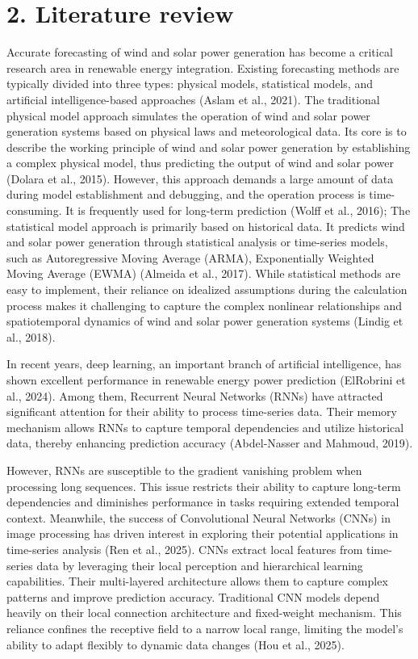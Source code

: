 \documentclass[
  10
]{article}
\begin{document}
\section{2. Literature review}\label{literature-review}

Accurate forecasting of wind and solar power generation has become a
critical research area in renewable energy integration. Existing
forecasting methods are typically divided into three types: physical
models, statistical models, and artificial intelligence-based approaches
(Aslam et al., 2021). The traditional physical model approach simulates
the operation of wind and solar power generation systems based on
physical laws and meteorological data. Its core is to describe the
working principle of wind and solar power generation by establishing a
complex physical model, thus predicting the output of wind and solar
power (Dolara et al., 2015). However, this approach demands a large
amount of data during model establishment and debugging, and the
operation process is time-consuming. It is frequently used for long-term
prediction (Wolff et al., 2016); The statistical model approach is
primarily based on historical data. It predicts wind and solar power
generation through statistical analysis or time-series models, such as
Autoregressive Moving Average (ARMA), Exponentially Weighted Moving
Average (EWMA) (Almeida et al., 2017). While statistical methods are
easy to implement, their reliance on idealized assumptions during the
calculation process makes it challenging to capture the complex
nonlinear relationships and spatiotemporal dynamics of wind and solar
power generation systems (Lindig et al., 2018).

In recent years, deep learning, an important branch of artificial
intelligence, has shown excellent performance in renewable energy power
prediction (ElRobrini et al., 2024). Among them, Recurrent Neural
Networks (RNNs) have attracted significant attention for their ability
to process time-series data. Their memory mechanism allows RNNs to
capture temporal dependencies and utilize historical data, thereby
enhancing prediction accuracy (Abdel-Nasser and Mahmoud, 2019).

However, RNNs are susceptible to the gradient vanishing problem when
processing long sequences. This issue restricts their ability to capture
long-term dependencies and diminishes performance in tasks requiring
extended temporal context. Meanwhile, the success of Convolutional
Neural Networks (CNNs) in image processing has driven interest in
exploring their potential applications in time-series analysis (Ren et
al., 2025). CNNs extract local features from time-series data by
leveraging their local perception and hierarchical learning
capabilities. Their multi-layered architecture allows them to capture
complex patterns and improve prediction accuracy. Traditional CNN models
depend heavily on their local connection architecture and fixed-weight
mechanism. This reliance confines the receptive field to a narrow local
range, limiting the model's ability to adapt flexibly to dynamic data
changes (Hou et al., 2025).
\end{document}
